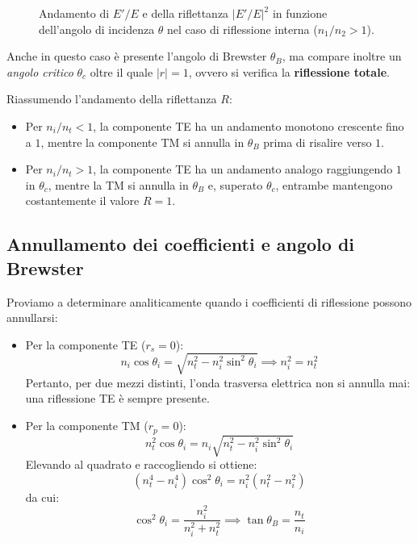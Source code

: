 \documentclass[openany,a4paper,12pt]{book}
\begin{document}
\begin{enumerate}
\begin{figure}[H]
\begin{subfigure}[t]{0.48\textwidth}
    \end{subfigure}
    \caption{Andamento di $E'/E$ e della riflettanza $|E'/E|^2$ in funzione dell'angolo di incidenza $\theta$ nel caso di riflessione interna ($n_1/n_2 > 1$).}
\end{figure}
    Anche in questo caso è presente l'angolo di Brewster $\theta_B$, ma compare inoltre un \textit{angolo critico} $\theta_c$ oltre il quale $|r| = 1$, ovvero si verifica la \textbf{riflessione totale}.
\end{enumerate}

Riassumendo l'andamento della riflettanza $R$:
\begin{itemize}
    \item Per $n_i/n_t < 1$, la componente TE ha un andamento monotono crescente fino a $1$, mentre la componente TM si annulla in $\theta_B$ prima di risalire verso $1$.
    \item Per $n_i/n_t > 1$, la componente TE ha un andamento analogo raggiungendo $1$ in $\theta_c$, mentre la TM si annulla in $\theta_B$ e, superato $\theta_c$, entrambe mantengono costantemente il valore $R = 1$.
\end{itemize}

\subsection*{Annullamento dei coefficienti e angolo di Brewster}

Proviamo a determinare analiticamente quando i coefficienti di riflessione possono annullarsi:
\begin{itemize}
    \item Per la componente TE ($r_s = 0$):
    \[
        n_i \cos\theta_i = \sqrt{n_t^2 - n_i^2 \sin^2\theta_i} \implies n_i^2 = n_t^2
    \]
    Pertanto, per due mezzi distinti, l'onda trasversa elettrica non si annulla mai: una riflessione TE è sempre presente.

    \item Per la componente TM ($r_p = 0$):
    \[
        n_t^2 \cos\theta_i = n_i \sqrt{n_t^2 - n_i^2 \sin^2\theta_i}
    \]
    Elevando al quadrato e raccogliendo si ottiene:
    \[
        (n_t^4 - n_i^4) \cos^2\theta_i = n_i^2 (n_t^2 - n_i^2)
    \]
    da cui:
    \[
        \cos^2\theta_i = \frac{n_i^2}{n_i^2 + n_t^2} \implies \tan\theta_B = \frac{n_t}{n_i}
    \]
\end{itemize}
\end{document}
